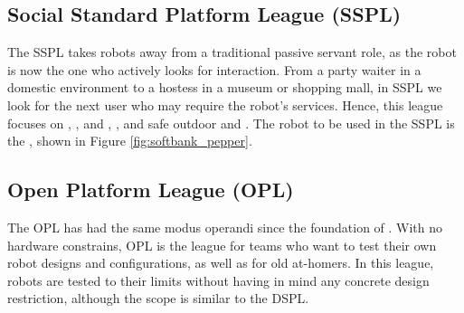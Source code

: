 \subsection{Social Standard Platform League (SSPL)}

The SSPL takes robots away from a traditional passive servant role, as the robot is now the one who actively looks for interaction.
From a party waiter in a domestic environment to a hostess in a museum or shopping mall, in SSPL we look for the next user who may require the robot's services.
Hence, this league focuses on \HRI, \NLP, \PerDet{} and \PerRec, \AB, and safe outdoor \NAV{} and \MAP.
The robot to be used in the SSPL is the \PEPPER, shown in Figure \ref{fig:softbank_pepper}.

\subsection{Open Platform League (OPL)}

The OPL has had the same modus operandi since the foundation of \AtHome.
With no hardware constrains, OPL is the league for teams who want to test their own robot designs and configurations, as well as for old at-homers.
In this league, robots are tested to their limits without having in mind any concrete design restriction, although the scope is similar to the DSPL.
